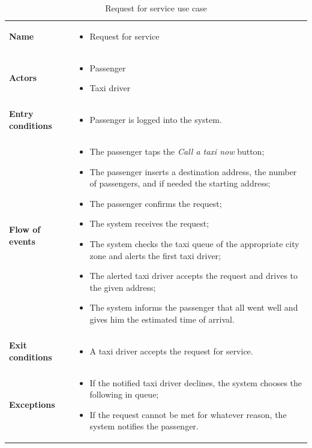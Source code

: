 \begin{table}
\begin{center}
\begin{tabular}{lp{}}
\toprule
\textbf{Name}		&	\begin{itemize}
					\item Request for service
					\end{itemize}	\\
\textbf{Actors}		&	\begin{itemize}
					\item Passenger
					\item Taxi driver
					\end{itemize}	\\
\textbf{Entry conditions}	&	\begin{itemize}
					\item Passenger is logged into the system.
					\end{itemize}	\\
\textbf{Flow of events}	&	\begin{itemize}
					\item The passenger taps the \emph{Call a taxi now} button;
					\item The passenger inserts a destination address, the number of passengers, and if needed the starting address;
					\item The passenger confirms the request;
					\item The system receives the request;
					\item The system checks the taxi queue of the appropriate city zone and alerts the first taxi driver;
					\item The alerted taxi driver accepts the request and drives to the given address;
					\item The system informs the passenger that all went well and gives him the estimated time of arrival.	
					\end{itemize}	\\
\textbf{Exit conditions}	&	\begin{itemize}
					\item	A taxi driver accepts the request for service.
					\end{itemize}	\\
\textbf{Exceptions}	&	\begin{itemize}
					\item If the notified taxi driver declines, the system chooses the following in queue;
					\item If the request cannot be met for whatever reason, the system notifies the passenger.
					\end{itemize}	\\
\bottomrule
\end{tabular}
\caption{Request for service use case}
\end{center}
\end{table}

